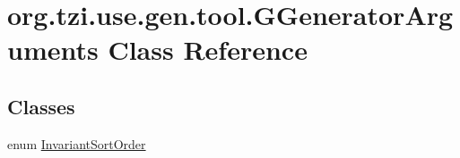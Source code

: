 \hypertarget{classorg_1_1tzi_1_1use_1_1gen_1_1tool_1_1_g_generator_arguments}{\section{org.\-tzi.\-use.\-gen.\-tool.\-G\-Generator\-Arguments Class Reference}
\label{classorg_1_1tzi_1_1use_1_1gen_1_1tool_1_1_g_generator_arguments}
}
\subsection*{Classes}
\begin{DoxyCompactItemize}
\item 
enum \hyperlink{enumorg_1_1tzi_1_1use_1_1gen_1_1tool_1_1_g_generator_arguments_1_1_invariant_sort_order}{Invariant\-Sort\-Order}
\end{DoxyCompactItemize}
